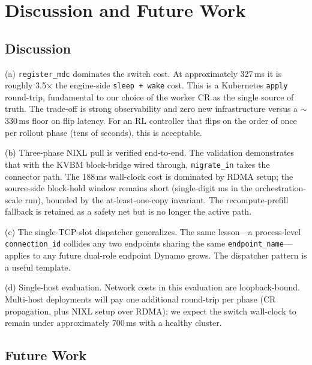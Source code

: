 \documentclass[10pt,twocolumn,letterpaper]{article}
\begin{document}
\section{Discussion and Future Work}
\label{sec:discussion}

\subsection{Discussion}

(a) \texttt{register\_mdc} dominates the switch cost. At approximately 327\,ms it is roughly 3.5$\times$ the engine-side \texttt{sleep~+~wake} cost. This is a Kubernetes \texttt{apply} round-trip, fundamental to our choice of the worker CR as the single source of truth. The trade-off is strong observability and zero new infrastructure versus a ${\sim}$330\,ms floor on flip latency. For an RL controller that flips on the order of once per rollout phase (tens of seconds), this is acceptable.

(b) Three-phase NIXL pull is verified end-to-end. The validation demonstrates that with the KVBM block-bridge wired through, \texttt{migrate\_in} takes the connector path. The 188\,ms wall-clock cost is dominated by RDMA setup; the source-side block-hold window remains short (single-digit ms in the orchestration-scale run), bounded by the at-least-one-copy invariant. The recompute-prefill fallback is retained as a safety net but is no longer the active path.

(c) The single-TCP-slot dispatcher generalizes. The same lesson---a process-level \texttt{connection\_id} collides any two endpoints sharing the same \texttt{endpoint\_name}---applies to any future dual-role endpoint Dynamo grows. The dispatcher pattern is a useful template.

(d) Single-host evaluation. Network costs in this evaluation are loopback-bound. Multi-host deployments will pay one additional round-trip per phase (CR propagation, plus NIXL setup over RDMA); we expect the switch wall-clock to remain under approximately 700\,ms with a healthy cluster.

\subsection{Future Work}
\end{document}
